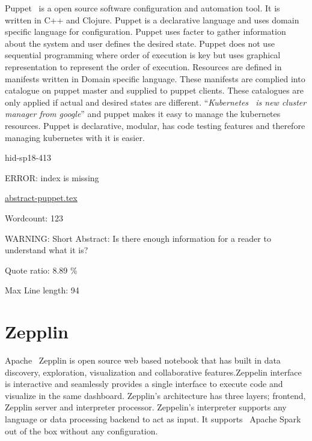 Puppet~\cite{hid-sp18-413-puppet} is a open source software configuration and
automation tool. It is written in C++ and Clojure. Puppet is a declarative
language and uses domain specific language for configuration. Puppet uses facter
to gather information about the system and user defines the desired
state. Puppet does not use sequential programming where order of execution is
key but uses graphical representation to represent the order of
execution. Resources are defined in manifests written in Domain specific
language. These manifests are complied into catalogue on puppet master and
supplied to puppet clients. These catalogues are only applied if actual and
desired states are different. \color{blue}``\emph{Kubernetes~\cite{hid-sp18-413-Kubernetes} is
new cluster manager from google}''\color{black} and puppet makes it easy to manage the
kubernetes resources. Puppet is declarative, modular, has code testing features
and therefore managing kubernetes with it is easier.


\begin{IU}

hid-sp18-413

ERROR: index is missing

\href{https://github.com/cloudmesh-community/hid-sp18-413/blob/master//technology/abstract-puppet.tex}{abstract-puppet.tex}

 

Wordcount: 123

WARNING: Short Abstract: Is there enough information for a reader to understand what it is?


Quote ratio: 8.89 \%
 
Max Line length: 94
\end{IU}

\section{Zepplin}

Apache~\cite{hid-sp18-413-Zeppelin} Zepplin is open source web based notebook
that has built in data discovery, exploration, visualization and collaborative
features.Zeppelin interface is interactive and seamlessly provides a single
interface to execute code and visualize in the same dashboard. Zepplin's
architecture has three layers; frontend, Zepplin server and interpreter
processor. Zeppelin's interpreter supports any language or data processing
backend to act as input. It supports~\cite{hid-sp18-413-ApacheSpark} Apache
Spark out of the box without any configuration.


